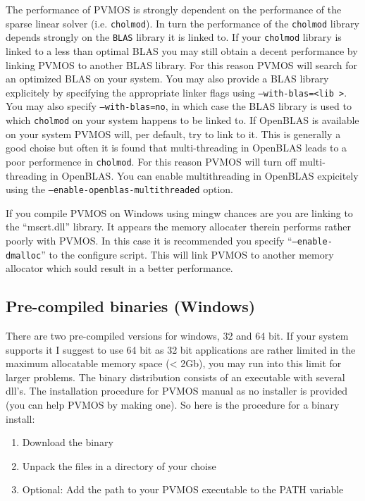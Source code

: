 \documentclass[noshowpacs,preprintnumbers,amsmath,amssymb, letter]{revtex4}
\begin{document}
The performance of PVMOS is strongly dependent on the performance of the sparse linear solver (i.e. \texttt{cholmod}). In turn the performance of the \texttt{cholmod} library depends strongly on the \texttt{BLAS} library it is linked to. If your \texttt{cholmod} library is linked to a less than optimal BLAS you may still obtain a decent performance by linking PVMOS to another BLAS library. For this reason PVMOS will search for an optimized BLAS on your system. You may also provide a BLAS library explicitely by specifying the appropriate linker flags using \texttt{--with-blas=\textless lib \textgreater}. You may also specify \texttt{--with-blas=no}, in which case the BLAS library is used to which \texttt{cholmod} on your system happens to be linked to. If OpenBLAS is available on your system PVMOS will, per default, try to link to it. This is generally a good choise but often it is found that multi-threading in OpenBLAS leads to a poor performence in \texttt{cholmod}. For this reason PVMOS will turn off multi-threading in OpenBLAS. You can enable multithreading in OpenBLAS expicitely using the \texttt{--enable-openblas-multithreaded} option. 

If you compile PVMOS on Windows using mingw chances are you are linking to the ``mscrt.dll'' library. It appears the memory allocater therein performs rather poorly with PVMOS. In this case it is recommended you specify ``\texttt{--enable-dmalloc}'' to the configure script. This will link PVMOS to another memory allocator which sould result in a better performance.


\subsection{Pre-compiled binaries (Windows)}
There are two pre-compiled versions for windows, 32 and 64 bit. If your system supports it I suggest to use 64 bit as 32 bit applications are rather limited in the maximum allocatable memory space (< 2Gb), you may run into this limit for larger problems. The binary distribution consists of an executable with several dll's. The installation procedure for PVMOS manual as no installer is provided (you can help PVMOS by making one). So here is the procedure for a binary install:
\begin{enumerate}
\item{} Download the binary 
\item{} Unpack the files in a directory of your choise
\item{} Optional: Add the path to your PVMOS executable to the PATH variable
\end{enumerate}
\end{document}
